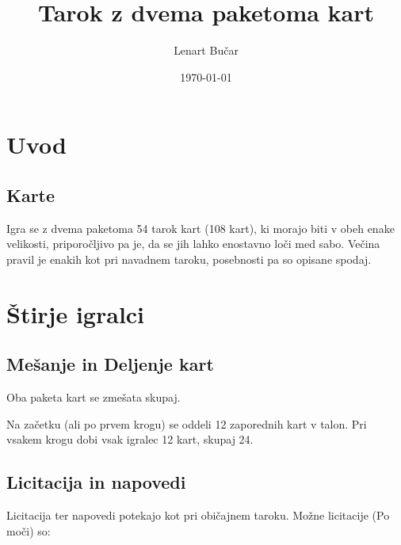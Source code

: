 \documentclass[a4paper, ]{report}
\author{Lenart Bučar}
\title{Tarok z dvema paketoma kart}
\date{\today}
\begin{document}
\part{Uvod}

\chapter{Karte}

Igra se z dvema paketoma 54 tarok kart (108 kart), ki morajo biti v obeh enake velikosti, priporočljivo pa je, da se jih lahko enostavno loči med sabo.
Večina pravil je enakih kot pri navadnem taroku, posebnosti pa so opisane spodaj.


\part{Štirje igralci}

\chapter{Mešanje in Deljenje kart}

Oba paketa kart se zmešata skupaj.

Na začetku (ali po prvem krogu) se oddeli 12 zaporednih kart v talon. Pri vsakem krogu dobi vsak igralec 12 kart, skupaj 24.

\chapter{Licitacija in napovedi}

Licitacija ter napovedi potekajo kot pri običajnem taroku.
Možne licitacije (Po moči) so:
\end{document}
